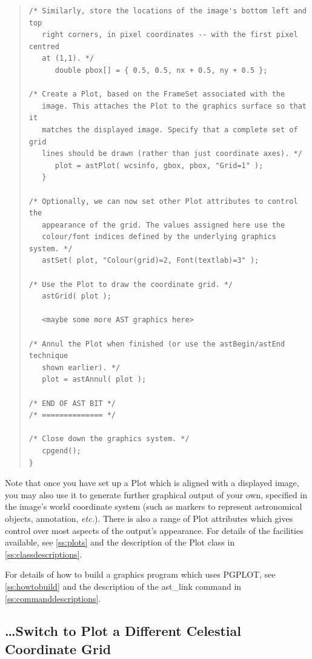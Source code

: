 \documentclass[twoside,11pt]{article}
\newcommand{\htmlref}[2]{#1}
\newcommand{\appref}[1]{Appendix~\ref{#1}}
\newcommand{\secref}[1]{\S\ref{#1}}
\renewcommand{\appref}[1]{\ref{#1}}
\renewcommand{\secref}[1]{\ref{#1}}
\begin{document}
\begin{quote}
\begin{verbatim}
/* Similarly, store the locations of the image's bottom left and top
   right corners, in pixel coordinates -- with the first pixel centred
   at (1,1). */
      double pbox[] = { 0.5, 0.5, nx + 0.5, ny + 0.5 };

/* Create a Plot, based on the FrameSet associated with the
   image. This attaches the Plot to the graphics surface so that it
   matches the displayed image. Specify that a complete set of grid
   lines should be drawn (rather than just coordinate axes). */
      plot = astPlot( wcsinfo, gbox, pbox, "Grid=1" );
   }

/* Optionally, we can now set other Plot attributes to control the
   appearance of the grid. The values assigned here use the
   colour/font indices defined by the underlying graphics system. */
   astSet( plot, "Colour(grid)=2, Font(textlab)=3" );

/* Use the Plot to draw the coordinate grid. */
   astGrid( plot );

   <maybe some more AST graphics here>

/* Annul the Plot when finished (or use the astBegin/astEnd technique
   shown earlier). */
   plot = astAnnul( plot );

/* END OF AST BIT */
/* ============== */

/* Close down the graphics system. */
   cpgend();
}
\end{verbatim}
\normalsize
\end{quote}

Note that once you have set up a \htmlref{Plot}{Plot} which is aligned with a
displayed image, you may also use it to generate further graphical
output of your own, specified in the image's world coordinate system
(such as markers to represent astronomical objects, annotation,
{\em{etc.}}). There is also a range of Plot attributes which gives
control over most aspects of the output's appearance.  For details of
the facilities available, see \secref{ss:plots} and the description of
the Plot class in \appref{ss:classdescriptions}.

For details of how to build a graphics program which uses PGPLOT, see
\secref{ss:howtobuild} and the description of the \htmlref{ast\_link}{ast_link} command in
\appref{ss:commanddescriptions}.

\subsection{\label{ss:howtoswitchgrid}\ldots Switch to Plot a Different Celestial Coordinate Grid}
\end{document}
